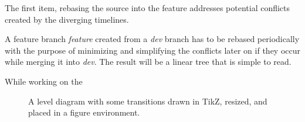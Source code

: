 \documentclass[10pt]{article}
\newcommand{\ket}[1]{$\left|#1\right\rangle$}
\newcommand{\Om}[1]{\small $\omega_{#1}$}
\newcommand{\De}[1]{$\Delta_{#1}$}
\newcommand{\Ga}[1]{$\Gamma_{#1}$}
\begin{document}
The first item, rebasing the source into the feature addresses potential conflicts created by the diverging timelines.




A feature branch \textit{feature} created from a \textit{dev} branch has to be rebased periodically with the purpose of minimizing and simplifying the conflicts later on if they occur while merging it into \textit{dev}.
The result will be a linear tree that is simple to read.

While working on the 

\begin{figure}
\centerline{
}
\caption{A level diagram with some transitions drawn in TikZ, resized,
                and placed in a figure environment.}
\end{figure}
\end{document}
